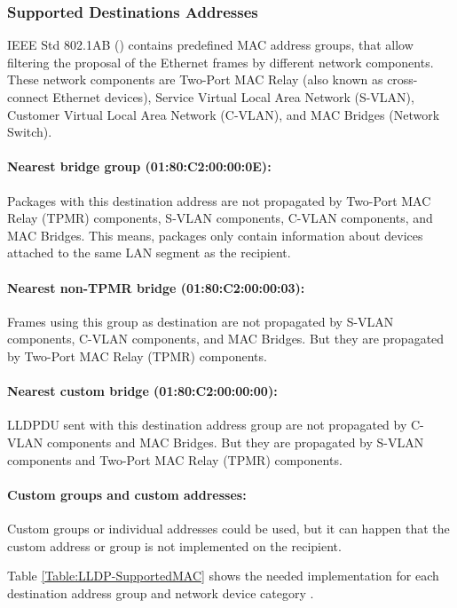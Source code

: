 \subsubsection{Supported Destinations Addresses}
\label{Section:LLDP-SupportedDestinationsAddresses}

IEEE Std 802.1AB (\cite{IEEE:LLDP:2016}) contains predefined MAC address groups, that allow filtering the proposal of the Ethernet frames by different network components. These network components are Two-Port MAC Relay (also known as cross-connect Ethernet devices), Service Virtual Local Area Network (S-VLAN), Customer Virtual Local Area Network (C-VLAN), and MAC Bridges (Network Switch).

\paragraph{Nearest bridge group (01:80:C2:00:00:0E):} Packages with this destination address are not propagated by Two-Port MAC Relay (TPMR) components, S-VLAN components, C-VLAN components, and MAC Bridges. This means, packages only contain information about devices attached to the same LAN segment as the recipient.

\paragraph{Nearest non-TPMR bridge (01:80:C2:00:00:03):} Frames using this group as destination are not propagated by S-VLAN components, C-VLAN components, and MAC Bridges. But they are propagated by Two-Port MAC Relay (TPMR) components.

\paragraph{Nearest custom bridge (01:80:C2:00:00:00):} LLDPDU sent with this destination address group are not propagated by C-VLAN components and MAC Bridges. But they are propagated by S-VLAN components and Two-Port MAC Relay (TPMR) components.

\paragraph{Custom groups and custom addresses:} Custom groups or individual addresses could be used, but it can happen that the custom address or group is not implemented on the recipient.

Table \ref{Table:LLDP-SupportedMAC} shows the needed implementation for each destination address group and network device category \cite{IEEE:LLDP:2016}.

